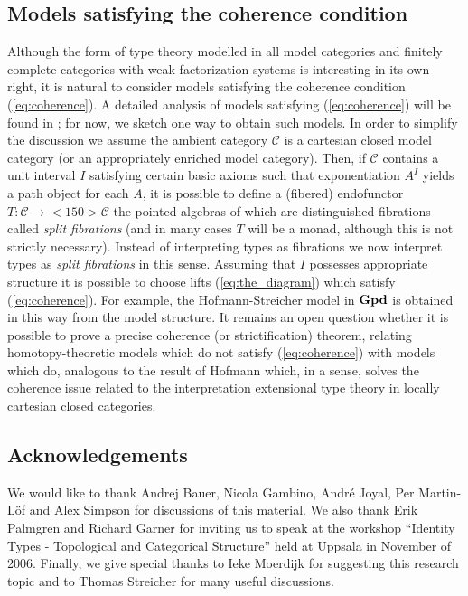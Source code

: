 \documentclass{amsart}
\newcommand{\groupoids}{\textnormal{\textbf{Gpd}}}
\theoremstyle{definition}
\theoremstyle{remark}
\begin{document}
\subsection{Models satisfying the coherence condition}

Although the form of type theory modelled in all model categories and
finitely complete categories with weak factorization systems is
interesting in its own right, it is natural to consider models
satisfying the coherence condition (\ref{eq:coherence}).  A detailed
analysis of models satisfying (\ref{eq:coherence}) will be found in
\cite{Warren:PhD}; for now, we sketch one way to obtain such models.
In order to simplify the discussion we assume
the ambient category $\mathcal{C}$ is a cartesian closed model
category (or an appropriately enriched model category).  Then, if
$\mathcal{C}$ contains a unit interval $I$ satisfying certain basic
axioms such that exponentiation $A^{I}$ yields a path object for each
$A$, it is possible to define a (fibered) endofunctor
$T:\mathcal{C}\to<150>\mathcal{C}$ the pointed algebras of which are
distinguished fibrations called \emph{split fibrations} (and in many
cases $T$ will be a monad, although this is not strictly necessary).
Instead of interpreting types as fibrations we now interpret types as
\emph{split fibrations} in this sense.  Assuming that $I$ possesses
appropriate structure it is possible to choose lifts
(\ref{eq:the_diagram}) which satisfy (\ref{eq:coherence}).  For
example, the Hofmann-Streicher model in $\groupoids$ is obtained in
this way from the model structure.  It remains an open question whether it
is possible to prove a precise coherence (or strictification) theorem,
relating homotopy-theoretic models which do not satisfy (\ref{eq:coherence})
with models which do, analogous to the result of Hofmann
\cite{Hofmann:OITTLCCC} which, in a sense, solves the coherence issue
related to the interpretation extensional type theory in locally
cartesian closed categories.  
 
\subsection{Acknowledgements}

We would like to thank Andrej Bauer, Nicola Gambino, Andr\'{e} Joyal,
Per Martin-L\"{o}f and Alex Simpson for discussions of this material.
We also thank Erik Palmgren and Richard Garner for inviting us to
speak at the workshop ``Identity Types - Topological and Categorical
Structure'' held at Uppsala in November of 2006.  Finally, we give special
thanks to Ieke Moerdijk for suggesting this research topic and to
Thomas Streicher for many useful discussions.
\end{document}
